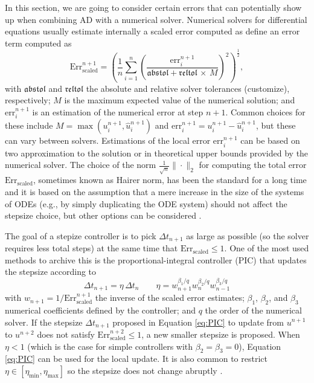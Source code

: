 \label{appendix:dual-number-solver}

In this section, we are going to consider certain errors that can potentially show up when combining AD with a numerical solver. 
Numerical solvers for differential equations usually estimate internally a scaled error computed as 
define an error term computed as \cite{hairer-solving-1, Rackauckas_Nie_2016}
\begin{equation}
    \text{Err}_\text{scaled}^{n+1}
    =
    \left( \frac{1}{n} \sum_{i=1}^n \left( \frac{\text{err}_i^{n+1}}{\mathfrak{abstol} + \mathfrak{reltol} \, \times \, M} \right)^2 \right)^{\frac{1}{2}},
    \label{eq:internal-norm-wrong}
\end{equation}
with $\mathfrak{abstol}$ and $\mathfrak{reltol}$ the absolute and relative solver tolerances (customize), respectively; $M$ is the maximum expected value of the numerical solution; and $\text{err}_i^{n+1}$ is an estimation of the numerical error at step $n+1$. 
Common choices for these include $M = \max (u_i^{n+1}, \hat u_i^{n+1})$ and $\text{err}_i^{n+1} = u_i^{n+1} - \hat u_i^{n+1}$, but these can vary between solvers. 
Estimations of the local error $\text{err}_i^{n+1}$ can be based on two approximation to the solution or in theoretical upper bounds provided by the numerical solver. 
The choice of the norm $\frac{1}{\sqrt n} \| \cdot \|_2$ for computing the total error $\text{Err}_\text{scaled}$, sometimes known as Hairer norm, has been the standard for a long time\cite{Ranocha_Dalcin_Parsani_Ketcheson_2022} and it is based on the assumption that a mere increase in the size of the systems of ODEs (e.g., by simply duplicating the ODE system) should not affect the stepsize choice, but other options can be considered \cite{hairer-solving-1}.   

The goal of a stepize controller is to pick $\Delta t_{n+1}$ as large as possible (so the solver requires less total steps) at the same time that $\text{Err}_\text{scaled} \leq 1$. 
One of the most used methods to archive this is the proportional-integral controller (PIC) that updates the stepsize according to \cite{hairer-solving-2, Ranocha_Dalcin_Parsani_Ketcheson_2022}
\begin{equation}
    \Delta t_{n+1} = \eta \, \Delta t_n
    \qquad 
    \eta = w_{n+1}^{\beta_1 / q} w_n^{\beta_2 / q} w_{n-1}^{\beta_3 / q}
    \label{eq:PIC}
\end{equation}
with $w_{n+1} = 1 / \text{Err}_\text{scaled}^{n+1}$ the inverse of the scaled error estimates; $\beta_1$, $\beta_2$, and $\beta_3$ numerical coefficients defined by the controller; and $q$ the order of the numerical solver. 
If the stepsize $\Delta t_{n+1}$ proposed in Equation \eqref{eq:PIC} to update from $u^{n+1}$ to $u^{n+2}$ does not satisfy $\text{Err}_\text{scaled}^{n+2} \leq 1$, a new smaller stepsize is proposed. 
When $\eta < 1$ (which is the case for simple controllers with $\beta_2 = \beta_3 = 0$), Equation \eqref{eq:PIC} can be used for the local update. 
It is also common to restrict $\eta \in [\eta_\text{min}, \eta_\text{max}]$ so the stepsize does not change abruptly \cite{hairer-solving-1}. 

